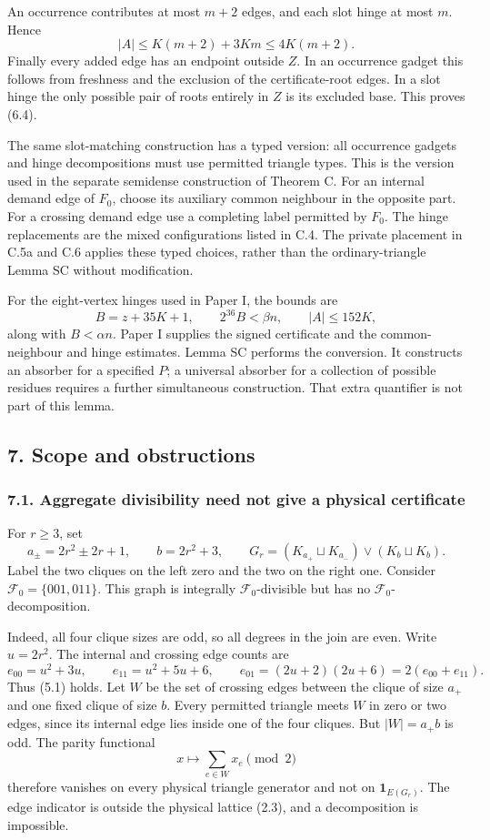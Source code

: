 \documentclass[english,11pt,a4paper]{article}
\begin{document}
An occurrence contributes at most \(m+2\) edges, and each slot hinge at most \(m\). Hence \[|A|\le K(m+2)+3Km\le4K(m+2).\] Finally every added edge has an endpoint outside \(Z\). In an occurrence gadget this follows from freshness and the exclusion of the certificate-root edges. In a slot hinge the only possible pair of roots entirely in \(Z\) is its excluded base. This proves (6.4).

The same slot-matching construction has a typed version: all occurrence gadgets and hinge decompositions must use permitted triangle types. This is the version used in the separate semidense construction of Theorem C. For an internal demand edge of \(F_0\), choose its auxiliary common neighbour in the opposite part. For a crossing demand edge use a completing label permitted by \(F_0\). The hinge replacements are the mixed configurations listed in C.4. The private placement in C.5a and C.6 applies these typed choices, rather than the ordinary-triangle Lemma SC without modification.

For the eight-vertex hinges used in Paper I, the bounds are \[B=z+35K+1,\qquad 2^{36}B<\beta n,\qquad |A|\le152K,
\tag{6.7}\] along with \(B<\alpha n\). Paper I supplies the signed certificate and the common-neighbour and hinge estimates. Lemma SC performs the conversion. It constructs an absorber for a specified \(P\); a universal absorber for a collection of possible residues requires a further simultaneous construction. That extra quantifier is not part of this lemma.


\subsection{7. Scope and obstructions}\label{scope-and-obstructions}

\subsubsection{7.1. Aggregate divisibility need not give a physical certificate}\label{aggregate-divisibility-need-not-give-a-physical-certificate}

For \(r\ge3\), set \[a_\pm=2r^2\pm2r+1,\qquad b=2r^2+3,
\qquad G_r=(K_{a_+}\sqcup K_{a_-})\vee(K_b\sqcup K_b).
\tag{7.1}\] Label the two cliques on the left zero and the two on the right one. Consider \(\mathcal F_0=\{001,011\}\). This graph is integrally \(\mathcal F_0\)-divisible but has no \(\mathcal F_0\)-decomposition.

Indeed, all four clique sizes are odd, so all degrees in the join are even. Write \(u=2r^2\). The internal and crossing edge counts are \[e_{00}=u^2+3u,\qquad e_{11}=u^2+5u+6,
\qquad e_{01}=(2u+2)(2u+6)=2(e_{00}+e_{11}).
\tag{7.2}\] Thus (5.1) holds. Let \(W\) be the set of crossing edges between the clique of size \(a_+\) and one fixed clique of size \(b\). Every permitted triangle meets \(W\) in zero or two edges, since its internal edge lies inside one of the four cliques. But \(|W|=a_+b\) is odd. The parity functional \[x\longmapsto\sum_{e\in W}x_e\pmod2
\tag{7.3}\] therefore vanishes on every physical triangle generator and not on \(\mathbf1_{E(G_r)}\). The edge indicator is outside the physical lattice (2.3), and a decomposition is impossible.
\end{document}
